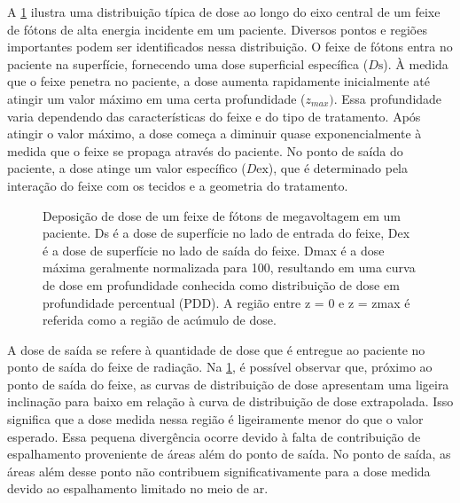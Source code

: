 \documentclass[11pt,a4paper]{article}
\begin{document}
	A \ref{fig:pdpSaida} ilustra uma distribuição típica de dose ao longo do eixo central de um feixe de fótons de alta energia incidente em um paciente. Diversos pontos e regiões importantes podem ser identificados nessa distribuição. O feixe de fótons entra no paciente na superfície, fornecendo uma dose superficial específica ($D\text{s}$). À medida que o feixe penetra no paciente, a dose aumenta rapidamente inicialmente até atingir um valor máximo em uma certa profundidade ($z_{max})$. Essa profundidade varia dependendo das características do feixe e do tipo de tratamento. Após atingir o valor máximo, a dose começa a diminuir quase exponencialmente à medida que o feixe se propaga através do paciente. No ponto de saída do paciente, a dose atinge um valor específico ($D\text{ex}$), que é determinado pela interação do feixe com os tecidos e a geometria do tratamento.

	\begin{figure}[h]
		\centering
		\caption{Deposição de dose de um feixe de fótons de megavoltagem em um paciente. Ds é a dose de superfície no lado de entrada do feixe, Dex é a dose de superfície no lado de saída do feixe. Dmax é a dose máxima geralmente normalizada para 100, resultando em uma curva de dose em profundidade conhecida como distribuição de dose em profundidade percentual (PDD). A região entre z = 0 e z = zmax é referida como a região de acúmulo de dose.}
		\label{fig:pdpSaida}
	\end{figure}

	A dose de saída se refere à quantidade de dose que é entregue ao paciente no ponto de saída do feixe de radiação. Na \ref{fig:pdpSaida}, é possível observar que, próximo ao ponto de saída do feixe, as curvas de distribuição de dose apresentam uma ligeira inclinação para baixo em relação à curva de distribuição de dose extrapolada. Isso significa que a dose medida nessa região é ligeiramente menor do que o valor esperado. Essa pequena divergência ocorre devido à falta de contribuição de espalhamento proveniente de áreas além do ponto de saída. No ponto de saída, as áreas além desse ponto não contribuem significativamente para a dose medida devido ao espalhamento limitado no meio de ar.
\end{document}
